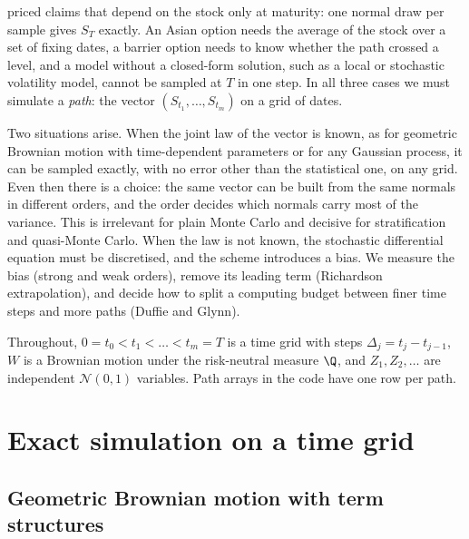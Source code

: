 
 priced claims that depend on the stock only at maturity: one
normal draw per sample gives $S_T$ exactly. An Asian option needs the average of the
stock over a set of fixing dates, a barrier option needs to know whether the path crossed a
level, and a model without a closed-form solution, such as a local or stochastic volatility
model, cannot be sampled at $T$ in one step. In all three cases we must simulate a
\emph{path}: the vector $(S_{t_1},\dots,S_{t_m})$ on a grid of dates.

Two situations arise. When the joint law of the vector is known, as for geometric Brownian
motion with time-dependent parameters or for any Gaussian process, it can be sampled
exactly, with no error other than the statistical one, on any grid. Even then there is a
choice: the same vector can be built from the same normals in different orders, and the
order decides which normals carry most of the variance. This is irrelevant for plain Monte
Carlo and decisive for stratification and quasi-Monte Carlo. When the law is not known,
the stochastic differential equation must be discretised, and the scheme introduces a
bias. We measure the bias (strong and weak orders), remove its leading term (Richardson
extrapolation), and decide how to split a computing budget between finer time steps and
more paths (Duffie and Glynn).

Throughout, $0=t_0<t_1<\dots<t_m=T$ is a time grid with steps $\Delta_j=t_j-t_{j-1}$,
$W$ is a Brownian motion under the risk-neutral measure $\Q$, and $Z_1,Z_2,\dots$ are
independent $\mathcal N(0,1)$ variables. Path arrays in the code have one row per path.

\section{Exact simulation on a time grid}\label{sec:ps-exact}

\subsection{Geometric Brownian motion with term structures}

